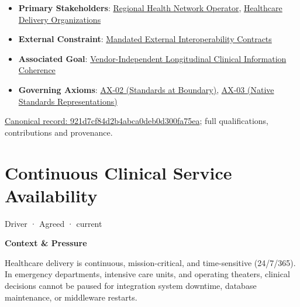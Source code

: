 \begin{itemize}


\item \textbf{Primary Stakeholders}: \href{\detokenize{../../../../../docs/markdown/01-motivation/stakeholders/enterprise-stakeholders.md}}{Regional Health Network Operator}, \href{\detokenize{../../../../../docs/markdown/01-motivation/stakeholders/enterprise-stakeholders.md}}{Healthcare Delivery Organizations}

\item \textbf{External Constraint}: \href{\detokenize{../../../../../docs/markdown/01-motivation/requirements-constraints/external-constraints.md}}{Mandated External Interoperability Contracts}

\item \textbf{Associated Goal}: \href{\detokenize{../../../../../docs/markdown/01-motivation/goals-outcomes/strategic-goals.md}}{Vendor-Independent Longitudinal Clinical Information Coherence}

\item \textbf{Governing Axioms}: \hyperref[element:eee8c3783d964d18a7f9dcea85fcd4cf]{AX-02 (Standards at Boundary)}, \hyperref[element:e99a4e2bf99f476d876394300d6b9c3d]{AX-03 (Native Standards Representations)}

\end{itemize}

{\footnotesize \href{../../../../continuum/motivation/driver/921d7cf84d2b4abca0deb0d300fa75ea.md}{Canonical record: 921d7cf84d2b4abca0deb0d300fa75ea}; full qualifications, contributions and provenance.}\par
\section{Continuous Clinical Service Availability}

\label{element:80e2d5f142da4dae8b7bb70e9ddcab06}
{\small Driver · Agreed · current}\par

\par\medskip\textbf{Context \& Pressure}\par


Healthcare delivery is continuous, mission-critical, and time-sensitive (24/7/365). In emergency departments, intensive care units, and operating theaters, clinical decisions cannot be paused for integration system downtime, database maintenance, or middleware restarts.



